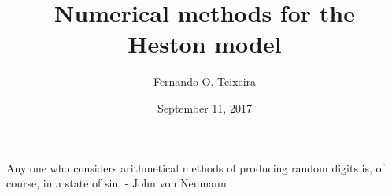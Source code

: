 \documentclass[12pt,twoside]{reedthesis}
\title{\textbf{\Huge{Numerical methods for the \\[20pt] Heston model}}}
\author{Fernando O. Teixeira}
\date{September 11, 2017}
\theoremstyle{definition}
\theoremstyle{definition}
\theoremstyle{remark}
\begin{document}
      \maketitle
  
  \frontmatter %
  \pagestyle{empty} %
      \begin{acknowledgements}
      Any one who considers arithmetical methods of producing random digits
      is, of course, in a state of sin. - John von Neumann
      \textbf{\\ \\ \\ \\ \\ \\ \\ \\ \\ \\ \\ \\ \\ \\ \\ \\ \\ \\ \\ \\ \\ \\ \\ \\ \\ \\ \\ \\ \\ \\ \\ \\ \\ \\ \\ \\ \\ \\ \\ \\ \\ \\ \\ \\ \\ \\ \\ \\ \\ \\ \\ \\ \\ \\ \\ \\ \\ \\ \\ \\ \\ \\ \\ }

\end{acknowledgements}
\end{document}

